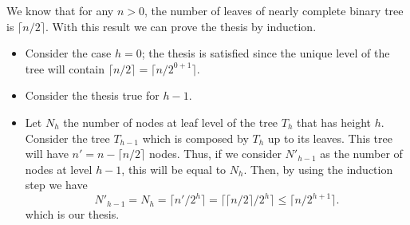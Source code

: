 \documentclass{article}
\begin{document}
	\noindent We know that for any $n > 0$, the number of leaves of nearly complete binary tree is $ \lceil n/2 \rceil$. With this result we can prove the thesis by induction. 
	\begin{itemize}
		\item Consider the case $h=0$; the thesis is satisfied since the unique level of the tree will contain $ \lceil n/2 \rceil = \lceil n/2^{0+1} \rceil$.
		\item Consider the thesis true for $h-1$.
		\item Let $N_h$ the number of nodes at leaf level of the tree $T_h$ that has height $h$. Consider the tree $T_{h-1}$ which is composed by $T_h$ up to its leaves. This tree will have $n' = n- \lceil n/2 \rceil$ nodes. Thus, if we consider $N'_{h-1}$ as the number of nodes at level $h-1$, this will be equal to $N_h$. Then, by using the induction step we have 
		$$
		N'_{h-1} = N_{h} = \lceil n' / 2^h\rceil = \lceil \lceil n/2\rceil / 2^h\rceil \leq \lceil n / 2^{h+1}\rceil.
		$$ 
		which is our thesis.
	\end{itemize}

	
	
	
\end{document}
